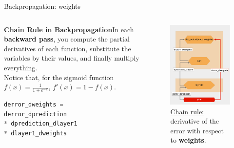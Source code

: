 \documentclass{beamer}
\begin{document}
\begin{frame}[fragile]{Backpropagation: weights}
    \begin{columns}
        \begin{column}{0.6\linewidth}     
            {\bf Chain Rule in Backpropagation}In each {\bf backward pass}, you compute the partial derivatives of each function, substitute the variables by their values, and finally multiply everything.
            \\[10pt]
            Notice that, for the sigmoid function $f(x)=\frac{1}{1+e^{-x}}$, $f'(x)=1-f(x)$.
            \\[10pt]
            \begin{lstlisting}[language=Python]
derror_dweights = 
derror_dprediction 
* dprediction_dlayer1 
* dlayer1_dweights
            \end{lstlisting}
        \end{column}
        \begin{column}{0.4\linewidth}
            \begin{figure}
                \includegraphics[width=0.9\linewidth]{WeightGradient.png}
                \caption{\href{https://realpython.com/python-ai-neural-network/}{Chain rule:}  derivative of the  error with respect to {\bf weights}.}
                \label{Fig:Training2Layer}
            \end{figure}
        \end{column}
     \end{columns}
\end{frame}
\end{document}
